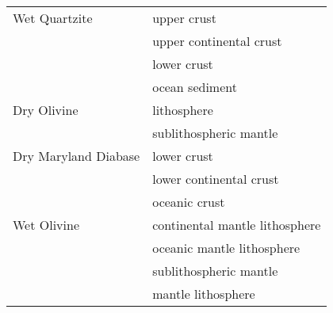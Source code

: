 \begin{center}
\begin{tabular}{l|l}
\hline

Wet Quartzite & upper crust  \cite{jahu12,wabj08} \\
              & upper continental crust \cite{kecw09,cube11} \\
              & lower crust  \cite{jahu12,wabj08} \\
              & ocean sediment \cite{kecw09} \\
Dry Olivine   & lithosphere  \cite{hube07}\\
              & sublithospheric mantle \cite{hube07}\\
Dry Maryland Diabase & lower crust \cite{wabj08,wabj08b} \\
                     & lower continental crust \cite{kecw09,cube11} \\
                     & oceanic crust \cite{wabj08,kecw09,wabj08b,cube11} \\
Wet Olivine   & continental mantle lithosphere \cite{wabj08,wabj08b} \\
              & oceanic mantle lithosphere \cite{wabj08,wabj08b} \\
              & sublithospheric mantle \cite{wabj08,kecw09,wabj08b} \\
              & mantle lithosphere \cite{kecw09} \\
\hline
\end{tabular}
\end{center}



\Literature \cite{buwa06,budr08,rana97a,rana97b}



